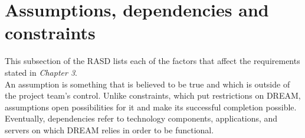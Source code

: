 \section{Assumptions, dependencies and constraints}

This subsection of the RASD lists each of the factors that affect the requirements stated in \textit{Chapter 3}.\\

An assumption is something that is believed to be true and which is outside of the project team’s control. Unlike constraints, which put restrictions on DREAM, assumptions open possibilities for it and make its successful completion possible.
Eventually, dependencies refer to technology components, applications, and servers on which DREAM relies in order to be functional.



